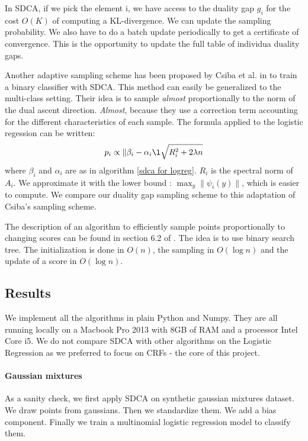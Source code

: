 \documentclass{article}
\DeclareMathOperator{\1}{\mathbb{1}}
\begin{document}
In SDCA, if we pick the element i, we have access to the duality gap $g_i$ for the cost $O(K)$ of computing a KL-divergence.
We can update the sampling probability.
We also have to do a batch update periodically to get a certificate of convergence.
This is the opportunity to update the full table of individua duality gaps.

Another adaptive sampling scheme has been proposed by Csiba et al.  in \cite{csiba_stochastic_2015} to train a binary classifier with SDCA.
This method can easily be generalized to the multi-class setting.
Their idea is to sample \textit{almost} proportionally to the norm of the dual ascent direction.
\textit{Almost}, because they use a correction term accounting for the different characteristics of each sample.
The formula applied to the logistic regession can be written:
\begin{equation}
	\label{csiba}
	p_i \propto \| \beta_i - \alpha_i \l \sqrt{R_i^2 + 2 \lambda n} 
\end{equation}
where $\beta_i$ and $\alpha_i$ are as in algorithm \ref{sdca for logreg}. 
$R_i$ is the spectral norm of $A_i$.
We approximate it with the lower bound : $\max_y \| \psi_i(y)\|$, which is easier to compute.
We compare our duality gap sampling scheme to this adaptation of Csiba's sampling scheme.

The description of an algorithm to efficiently sample points proportionally to changing scores can be found in section 6.2 of \cite{nesterov_efficiency_2012}.
The idea is to use binary search tree.
The initialization is done in $O(n)$, the sampling in $O(\log n)$ and the update of a score in $O(\log n)$.

\subsection{Results}

We implement all the algorithms in plain Python and Numpy.
They are all running locally on a Macbook Pro 2013 with 8GB of RAM and a processor Intel Core i5.
We do not compare SDCA with other algorithms on the Logistic Regression as we preferred to focus on CRFs - the core of this project.

\paragraph{Gaussian mixtures}
As a sanity check, we first apply SDCA on synthetic gaussian mixtures dataset.
We draw points from gaussians.
Then we standardize them.
We add a bias component.
Finally we train a multinomial logistic regression model to classify them.
\end{document}
